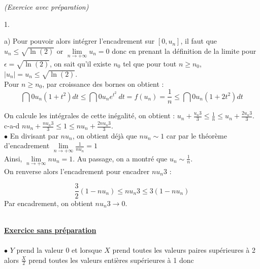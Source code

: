 \documentclass[11pt]{article}%
\begin{document}
\begin{exercice}{\it (Exercice avec préparation)}
\begin{noliste}{1.}
\begin{noliste}{a)}
 Pour pouvoir alors intégrer l'encadrement sur $[0, u_{n}]$, il faut
que $u_{n} \leq \sqrt{\ln(2)}$ or $\lim \limits_{n \to + \infty } u_{n}
= 0$ donc en prenant la définition de la limite pour $ \epsilon =
\sqrt{\ln(2)}$, on sait qu'il existe $n_{0}$ tel que pour tout $n \geq
n_{0}$, $|u_{n}| = u_{n} \leq \sqrt{\ln(2)}$. \\
 Pour $n \geq n_{0}$, par croissance des bornes on obtient : 
 \[
 \dint{0}{u_{n}} (1 + t^{2})dt \leq \dint{0}{u_{n}} e^{t^{2}} \ dt =
 f(u_{n}) = \frac{1}{n} \leq \dint{0}{u_{n}} (1 + 2t^{2})dt
\]
 \item On calcule les intégrales de cette inégalité, on obtient :
$u_{n} + \frac{u_{n}{3}}{3} \leq \frac{1}{n} \leq u_{n} +
\frac{2u_{n}{3}}{3}$. \\
 c-a-d $nu_{n} + \frac{nu_{n}{3}}{3} \leq 1 \leq nu_{n} + \frac{2n
u_{n}{3}}{3}$.\\
 $\bullet$ En divisant par $n u_{n}$, on obtient déjà que $ n u_{n}
\sim 1$ car par le théorème d'encadrement $\lim \limits_{n \to +
\infty} \frac{1}{nu_{n}} = 1$ \\
 Ainsi, $\lim \limits_{n \to + \infty} nu_{n} = 1$. Au passage, on a
montré que $u_{n} \sim \frac{1}{n}$.\\
 On renverse alors l'encadrement pour encadrer $n u_{n}{3}$ : 
 
\[
 \frac{3}{2}(1-n u_{n}) \leq n u_{n}{3} \leq 3(1-n u_{n})
\]
 Par encadrement, on obtient $ n u_{n}{3} \to 0$.\\
\\
 \end{noliste}
 \end{noliste}
 \textbf{\underline{Exercice sans préparation}} \\
\\
 $\bullet$ $Y$ prend la valeur 0 et lorsque $X$ prend toutes les
valeurs paires supérieures à 2 alors $\frac{X}{2}$ prend toutes les
valeurs entières supérieures à 1 donc 
 

\end{exercice}
\end{document}
